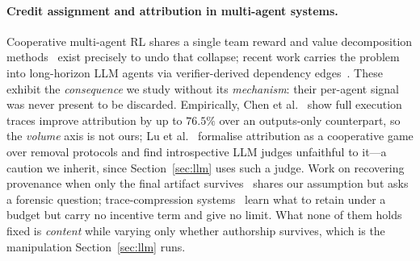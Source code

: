 \paragraph{Credit assignment and attribution in multi-agent systems.}
Cooperative multi-agent RL shares a single team reward and value decomposition
methods~\cite{qmix,coma,vdn} exist precisely to undo that collapse; recent work
carries the problem into long-horizon LLM agents via verifier-derived dependency
edges~\cite{vict2026}. These exhibit the \emph{consequence} we study without its
\emph{mechanism}: their per-agent signal was never present to be discarded.
Empirically, Chen et al.~\cite{chen2026elephant} show full execution traces
improve attribution by up to $76.5\%$ over an outputs-only counterpart, so the
\emph{volume} axis is not ours; Lu et al.~\cite{lu2026agentsmatter} formalise
attribution as a cooperative game over removal protocols and find introspective
LLM judges unfaithful to it---a caution we inherit, since
Section~\ref{sec:llm} uses such a judge. Work on recovering provenance when only
the final artifact survives~\cite{finaltextsurvives} shares our assumption but
asks a forensic question; trace-compression systems~\cite{trace2026,tracer2026}
learn what to retain under a budget but carry no incentive term and give no
limit. What none of them holds fixed is \emph{content} while varying only whether
authorship survives, which is the manipulation Section~\ref{sec:llm} runs.

